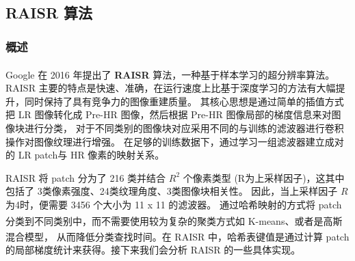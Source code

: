 \documentclass[12pt, a4paper, oneside]{ctexbook}
\begin{document}
	\subsection{RAISR 算法}
	\subsubsection{概述}
	Google 在 2016 年提出了 \textbf{RAISR}\textsuperscript{\cite{1}} 算法，一种基于样本学习的超分辨率算法。 
	RAISR 主要的特点是快速、准确，在运行速度上比基于深度学习的方法有大幅提升，同时保持了具有竞争力的图像重建质量。
	其核心思想是通过简单的插值方式把 LR 图像转化成 Pre-HR 图像，然后根据 Pre-HR 图像局部的梯度信息来对图像块进行分类，
	对于不同类别的图像块对应采用不同的与训练的滤波器进行卷积操作对图像纹理进行增强。
	在足够的训练数据下，通过学习一组滤波器建立成对的 LR patch与 HR 像素的映射关系。
	\par RAISR 将 patch 分为了 216 类并结合 $R^2$ 个像素类型 (R为上采样因子)，这其中包括了 3类像素强度、24类纹理角度、3类图像块相关性。
	因此，当上采样因子 $R$ 为4时，便需要 3456 个大小为 11 x 11 的滤波器。
	通过哈希映射的方式将 patch 分类到不同类别中，而不需要使用较为复杂的聚类方式如 K-means\textsuperscript{\cite{2}}、或者是高斯混合模型\textsuperscript{\cite{3}}，
	从而降低分类查找时间。在 RAISR 中，哈希表键值是通过计算 patch 的局部梯度统计来获得。接下来我们会分析 RAISR 的一些具体实现。
\end{document}
